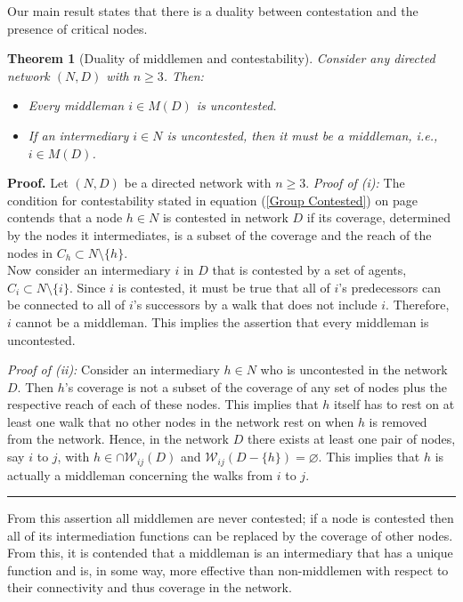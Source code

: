 \documentclass[11pt,fleqn]{article}
\newtheorem{theorem}{Theorem}[section]
\newenvironment{proof}[1][Proof]{\noindent \textbf{#1.} }{\hfill
\rule{0.5em}{0.5em}}
\begin{document}
Our main result states that there is a duality between contestation and the presence of critical nodes.
\begin{theorem}[Duality of middlemen and contestability] \label{duality}
Consider any directed network $(N,D)$ with $n \geqslant 3$. Then:
\begin{itemize}
\item[(i)] Every middleman $i \in M(D)$ is uncontested.

\item[(ii)] If an intermediary $i \in N$ is uncontested, then it must be a middleman, i.e., $i \in M(D)$.
\end{itemize}
\end{theorem}
\begin{proof}
Let $(N,D)$ be a directed network with $n \geqslant 3$.
\smallskip\noindent
\emph{Proof of (i):}
The condition for contestability stated in equation (\ref{Group Contested}) on page \pageref{Group Contested} contends that a node $h \in N$ is contested in network $D$ if its coverage, determined by the nodes it intermediates, is a subset of the coverage and the reach of the nodes in $C_{h} \subset N \setminus \{ h \}$.
\\
Now consider an intermediary $i$ in $D$ that is contested by a set of agents, $C_{i} \subset N \setminus \{ i \}$. Since $i$ is contested, it must be true that all of $i$'s predecessors can be connected to all of $i$'s successors by a walk that does not include $i$. Therefore, $i$ cannot be a middleman. This implies the assertion that every middleman is uncontested.

\smallskip\noindent
\emph{Proof of (ii):}
Consider an intermediary $h \in N$ who is uncontested in the network $D$. Then $h$'s coverage is not a subset of the coverage of any set of nodes plus the respective reach of each of these nodes. This implies that $h$ itself has to rest on at least one walk that no other nodes in the network rest on when $h$ is removed from the network. Hence, in the network $D$ there exists at least one pair of nodes, say $i$ to $j$, with $h \in \cap \mathcal{W}_{ij} (D)$ and $\mathcal{W}_{ij}(D - \{h\}) = \varnothing$. This implies that $h$ is actually a middleman concerning the walks from $i$ to $j$.
\end{proof}

\medskip\noindent
From this assertion all middlemen are never contested; if a node is contested then all of its intermediation functions can be replaced by the coverage of other nodes. From this, it is contended that a middleman is an intermediary that has a unique function and is, in some way, more effective than non-middlemen with respect to their connectivity and thus coverage in the network.
\end{document}
